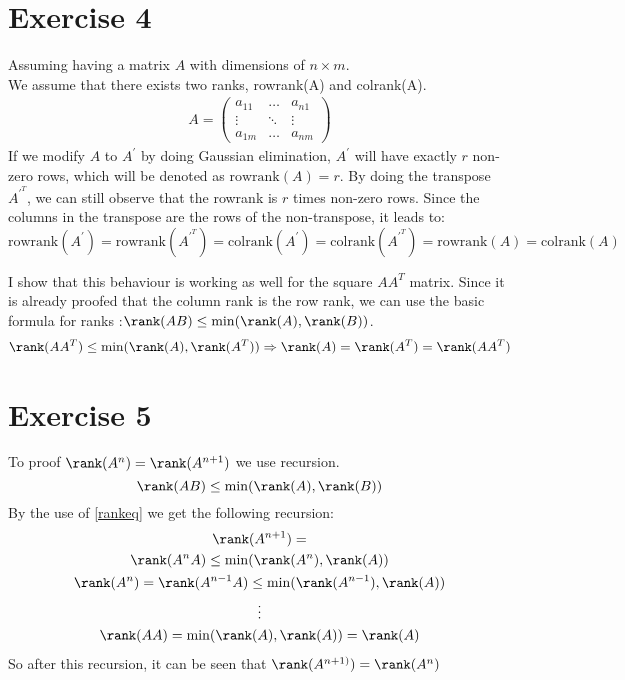 \section{Exercise 4}
Assuming having a matrix $A$ with dimensions of $n\times m$.\\
We assume that there exists two ranks, rowrank(A) and colrank(A).
\begin{gather*}
A = \left( \begin{array}{ccc}
a_{11} & \hdots & a_{n1} \\
\vdots & \ddots & \vdots \\
a_{1m} & \hdots & a_{nm}
\end{array} \right)
\end{gather*}
If we modify $A$ to $A^{'}$ by doing Gaussian elimination, $A^{'}$ will have exactly $r$ non-zero rows, which will be denoted as $\text{rowrank}(A) = r$. 
By doing the transpose $A^{{'}^T}$, we can still observe that the rowrank is $r$ times non-zero rows. Since the columns in the transpose are the rows of the non-transpose, it leads to:
\begin{equation*}
\text{rowrank}(A^{'}) = \text{rowrank}(A^{{'}^T}) = \text{colrank}(A^{'}) = \text{colrank}(A^{{'}^T}) = \text{rowrank}(A) = \text{colrank} (A)
\end{equation*}

I show that this behaviour is working as well for the square $AA^T$ matrix. Since it is already proofed that the column rank is the row rank, we can use the basic formula for ranks :$\rank(AB) \leq \min(\rank (A), \rank(B))$.
\begin{equation}
\rank(A A^T) \leq \min( \rank (A) , \rank (A^T)) \Rightarrow \rank (A)=\rank (A^T)= \rank (A A^T)
\end{equation}

\section{Exercise 5}
To proof $\rank (A^n) = \rank (A^{n+1})$  we use recursion. 
\begin{equation}
\label{rankeq}
\rank (AB) \leq \min (\rank (A), \rank (B))
\end{equation}
By the use of \ref{rankeq} we get the following recursion:
\begin{gather*}
\rank (A^{n+1}) = \\ 
\rank (A^{n} A) \leq \min ( \rank (A^n), \rank(A) ) \\
\rank (A^n) = \rank (A^{n-1} A) \leq \min ( \rank (A^{n-1}), \rank(A) ) \\
\vdots \\
\rank(A A) = \min ( \rank (A), \rank(A) ) = \rank(A)
\end{gather*}
So after this recursion, it can be seen that $\rank (A^{n+1)}) = \rank (A^{n})$

